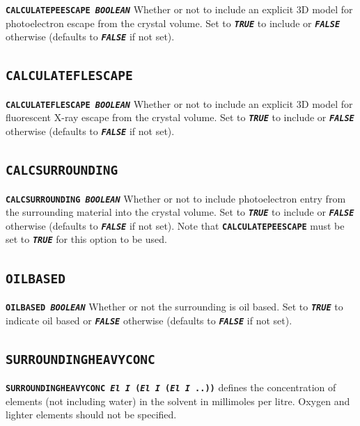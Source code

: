 \documentclass[a4paper]{article}
\newcommand{\Keyword}[1]{\texttt{\textbf{#1}}\xspace}
\begin{document}
\noindent \Keyword{CALCULATEPEESCAPE \textit{BOOLEAN}}
Whether or not to include an explicit 3D model for photoelectron escape from the crystal volume. Set to \Keyword{\textit{TRUE}} to include or \Keyword{\textit{FALSE}} otherwise (defaults to \Keyword{\textit{FALSE}} if not set). 

\subsection{\Keyword{CALCULATEFLESCAPE}}
\label{calculateflescape}

\noindent \Keyword{CALCULATEFLESCAPE \textit{BOOLEAN}}
Whether or not to include an explicit 3D model for fluorescent X-ray escape from the crystal volume. Set to \Keyword{\textit{TRUE}} to include or \Keyword{\textit{FALSE}} otherwise (defaults to \Keyword{\textit{FALSE}} if not set).

\subsection{\Keyword{CALCSURROUNDING}}
\label{calcsurrounding}

\noindent \Keyword{CALCSURROUNDING \textit{BOOLEAN}}
Whether or not to include photoelectron entry from the surrounding material into the crystal volume. Set to \Keyword{\textit{TRUE}} to include or \Keyword{\textit{FALSE}} otherwise (defaults to \Keyword{\textit{FALSE}} if not set).
Note that \Keyword{CALCULATEPEESCAPE} must be set to \Keyword{\textit{TRUE}} for this option to be used.

\subsection{\Keyword{OILBASED}}
\label{oilbased}

\noindent \Keyword{OILBASED \textit{BOOLEAN}}
Whether or not the surrounding is oil based. Set to \Keyword{\textit{TRUE}} to indicate oil based or \Keyword{\textit{FALSE}} otherwise (defaults to \Keyword{\textit{FALSE}} if not set).

\subsection{\Keyword{SURROUNDINGHEAVYCONC}}
\label{surroundingheavyconc}

\noindent \Keyword{SURROUNDINGHEAVYCONC \textit{El I} (\textit{El I} (\textit{El I} ..))}
defines the concentration of elements (not including water) in the solvent in millimoles per litre. Oxygen and lighter elements should not be specified.
\end{document}

